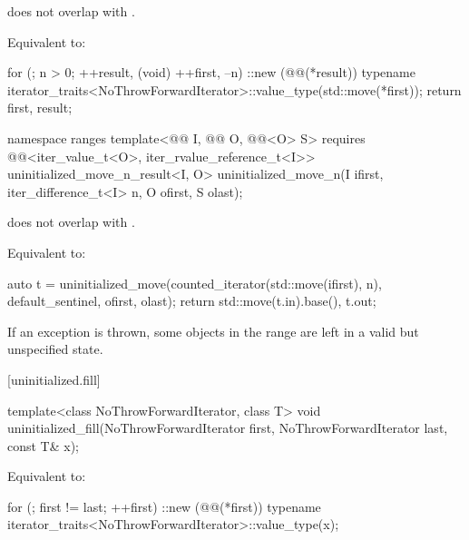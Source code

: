 \begin{itemdescr}
\pnum
\expects
{} does not overlap with .

\pnum
\effects
Equivalent to:
\begin{codeblock}
for (; n > 0; ++result, (void) ++first, --n)
  ::new (@@(*result))
    typename iterator_traits<NoThrowForwardIterator>::value_type(std::move(*first));
return {first, result};
\end{codeblock}
\end{itemdescr}

%
\begin{itemdecl}
namespace ranges {
  template<@@ I, @@ O, @@<O> S>
    requires @@<iter_value_t<O>, iter_rvalue_reference_t<I>>
    uninitialized_move_n_result<I, O>
      uninitialized_move_n(I ifirst, iter_difference_t<I> n, O ofirst, S olast);
}
\end{itemdecl}

\begin{itemdescr}
\pnum
\expects
{} does not overlap with .

\pnum
\effects
Equivalent to:
\begin{codeblock}
auto t = uninitialized_move(counted_iterator(std::move(ifirst), n),
                            default_sentinel, ofirst, olast);
return {std::move(t.in).base(), t.out};
\end{codeblock}

\pnum
\begin{note}
If an exception is thrown, some objects in the range
are left in a valid but unspecified state.
\end{note}
\end{itemdescr}

[uninitialized.fill]{}

%
\begin{itemdecl}
template<class NoThrowForwardIterator, class T>
  void uninitialized_fill(NoThrowForwardIterator first, NoThrowForwardIterator last, const T& x);
\end{itemdecl}

\begin{itemdescr}
\pnum
\effects
Equivalent to:
\begin{codeblock}
for (; first != last; ++first)
  ::new (@@(*first))
    typename iterator_traits<NoThrowForwardIterator>::value_type(x);
\end{codeblock}
\end{itemdescr}

